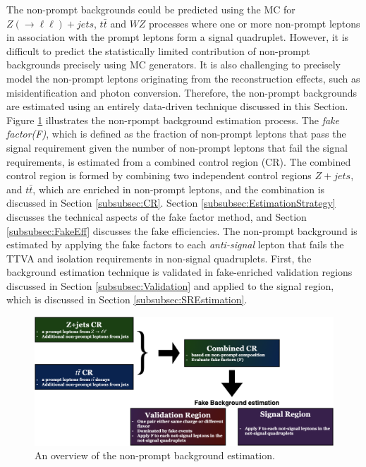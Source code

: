The non-prompt backgrounds could be predicted using the MC for $Z(\rightarrow \ell \ell) + jets $, $t\bar{t}$ and $WZ$ processes where one or more non-prompt leptons in association with the prompt leptons form a signal quadruplet. However, it is difficult to predict the statistically limited contribution of non-prompt backgrounds precisely using MC generators. It is also challenging to precisely model the non-prompt leptons originating from the reconstruction effects, such as misidentification and photon conversion. Therefore, the non-prompt backgrounds are estimated using an entirely data-driven technique discussed in this Section. Figure \ref{fig:FakeBkgOverview} illustrates the non-rpompt background estimation process. The \textit{fake factor(F)}, which is defined as the fraction of non-prompt leptons that pass the signal requirement given the number of non-prompt leptons that fail the signal requirements, is estimated from a combined control region (CR). The combined control region is formed by combining two independent control regions $Z+jets$, and $t\bar{t}$, which are enriched in non-prompt leptons, and the combination is discussed in Section \ref{subsubsec:CR}. Section \ref{subsubsec:EstimationStrategy} discusses the technical aspects of the fake factor method, and Section \ref{subsubsec:FakeEff} discusses the fake efficiencies. The non-prompt background is estimated by applying the fake factors to each \textit{anti-signal} lepton that fails the TTVA and isolation requirements in non-signal quadruplets. First, the background estimation technique is validated in fake-enriched validation regions discussed in Section \ref{subsubsec:Validation} and applied to the signal region, which is discussed in Section \ref{subsubsec:SREstimation}. 

\begin{figure}[!htb]
    \centering
    \includegraphics[width=.99\linewidth, angle =0]{figures/Analysis/Background/FakeBackgroundOverview.png}  
    \caption{An overview of the non-prompt background estimation.\label{fig:FakeBkgOverview}}
\end{figure}

